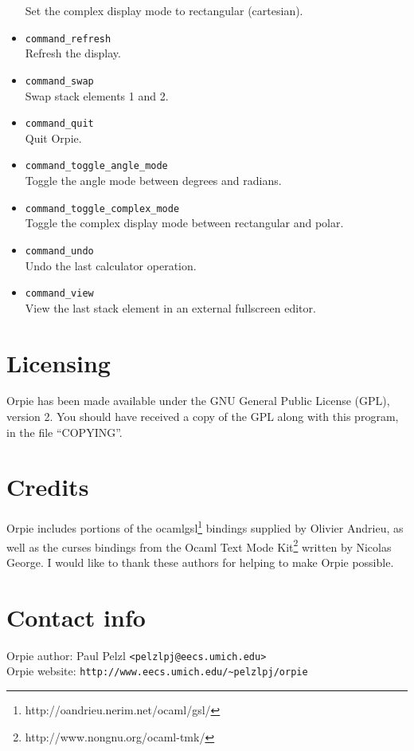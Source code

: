 \documentclass[11pt,notitlepage]{article}
\begin{document}
\begin{itemize}
      Set the complex display mode to rectangular (cartesian).
   \item {\tt command\_refresh} \\
      Refresh the display.
   \item {\tt command\_swap} \\
      Swap stack elements 1 and 2.
   \item {\tt command\_quit} \\
      Quit Orpie.
   \item {\tt command\_toggle\_angle\_mode} \\
      Toggle the angle mode between degrees and radians.
   \item {\tt command\_toggle\_complex\_mode} \\
      Toggle the complex display mode between rectangular and polar.
   \item {\tt command\_undo} \\
      Undo the last calculator operation.
   \item {\tt command\_view} \\
      View the last stack element in an external fullscreen editor.
\end{itemize}

\section{Licensing}
Orpie has been made available under the GNU General Public License (GPL), 
version 2.  You should have received a copy of the GPL along with this 
program, in the file ``COPYING''.


\section{Credits}
Orpie includes portions of the
ocamlgsl\footnote{http://oandrieu.nerim.net/ocaml/gsl/} bindings supplied by
Olivier Andrieu, as well as the curses bindings from the Ocaml Text Mode
Kit\footnote{http://www.nongnu.org/ocaml-tmk/} written by Nicolas George.  I
would like to thank these authors for helping to make Orpie possible.


\section{Contact info}
Orpie author: Paul Pelzl {\tt <pelzlpj@eecs.umich.edu>} \\
Orpie website: {\tt http://www.eecs.umich.edu/\~{}pelzlpj/orpie} \\
\end{document}
